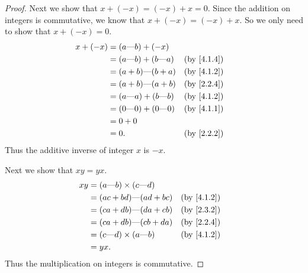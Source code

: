 \begin{proof}
  Next we show that \(x + (-x) = (-x) + x = 0\).
  Since the addition on integers is commutative, we know that \(x + (-x) = (-x) + x\).
  So we only need to show that \(x + (-x) = 0\).
  \begin{align*}
    x + (-x) & = (a \text{---} b) + (-x)                             \\
             & = (a \text{---} b) + (b \text{---} a) &  & \by{4.1.4} \\
             & = (a + b) \text{---} (b + a)          &  & \by{4.1.2} \\
             & = (a + b) \text{---} (a + b)          &  & \by{2.2.4} \\
             & = (a \text{---} a) + (b \text{---} b) &  & \by{4.1.2} \\
             & = (0 \text{---} 0) + (0 \text{---} 0) &  & \by{4.1.1} \\
             & = 0 + 0                                               \\
             & = 0.                                  &  & \by{2.2.2}
  \end{align*}
  Thus the additive inverse of integer \(x\) is \(-x\).

  Next we show that \(xy = yx\).
  \begin{align*}
    xy & = (a \text{---} b) \times (c \text{---} d)                 \\
       & = (ac + bd) \text{---} (ad + bc)           &  & \by{4.1.2} \\
       & = (ca + db) \text{---} (da + cb)           &  & \by{2.3.2} \\
       & = (ca + db) \text{---} (cb + da)           &  & \by{2.2.4} \\
       & = (c \text{---} d) \times (a \text{---} b) &  & \by{4.1.2} \\
       & = yx.
  \end{align*}
  Thus the multiplication on integers is commutative.


\end{proof}
